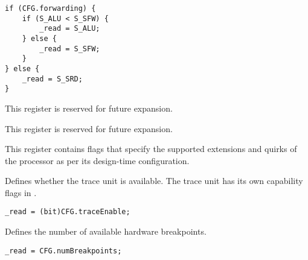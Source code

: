 \reset{****}
\implementation{}
\begin{lstlisting}
if (CFG.forwarding) {
    if (S_ALU < S_SFW) {
        _read = S_ALU;
    } else {
        _read = S_SFW;
    }
} else {
    _read = S_SRD;
}
\end{lstlisting}


This register is reserved for future expansion.


This register is reserved for future expansion.


This register contains flags that specify the supported extensions and quirks
of the processor as per its design-time configuration.

Defines whether the trace unit is available. The trace unit has its own
capability flags in .

\reset{***}
\implementation{}
\begin{lstlisting}
_read = (bit)CFG.traceEnable;
\end{lstlisting}

Defines the number of available hardware breakpoints.

\reset{***}
\implementation{}
\begin{lstlisting}
_read = CFG.numBreakpoints;
\end{lstlisting}

